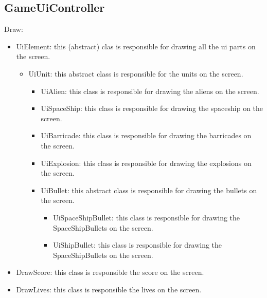 \documentclass[10pt]{article}
\begin{document}
\subsection*{GameUiController}
Draw:
\begin{itemize}
	\item UiElement: this (abstract) clas is responsible for drawing all the ui parts on the screen.
	\begin{itemize}
		\item UiUnit: this abstract class is responsible for the units on the screen.
			\begin{itemize}
				\item UiAlien: this class is responsible for drawing the aliens on the screen.
				\item UiSpaceShip: this class is responsible for drawing the spaceship on the screen.
				\item UiBarricade: this class is responsible for drawing the barricades on the screen.
				\item UiExplosion: this class is responsible for drawing the explosions on the screen.
				\item UiBullet: this abstract class is responsible for drawing the bullets on the screen.
				\begin{itemize}
					\item UiSpaceShipBullet: this class is responsible for drawing the SpaceShipBullets on the screen.
					\item UiShipBullet: this class is responsible for drawing the SpaceShipBullets on the screen.
				\end{itemize}
			\end{itemize}
	\end{itemize}
	\item DrawScore: this class is responsible the score on the screen.
	\item DrawLives: this class is responsible the lives on the screen.
\end{itemize}
\end{document}
